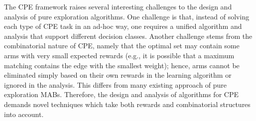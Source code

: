 \documentclass{article}
\newcommand{\junk}[1]{}
\newcommand{\Problem}{{CPE}\xspace}
\begin{document}
The \Problem framework raises several interesting challenges to the design and analysis of pure exploration algorithms. 
One challenge is that, instead of solving each type of \Problem task in an ad-hoc way, one requires a unified algorithm and analysis that support different decision classes.
Another challenge stems from the combinatorial nature of \Problem, namely that the optimal set may contain some arms with very small expected rewards (e.g., it is possible that a maximum matching contains the edge with the smallest weight); 
hence, arms cannot be eliminated simply based on their own rewards in the learning algorithm
	or ignored in the analysis.
%
%
%
This differs from many existing approach of pure exploration MABs.
Therefore, the design and analysis of algorithms for \Problem demands novel techniques which take both rewards and combinatorial structures into account.
\junk{
Before describing our results, we recall two common settings in pure exploration problems: fixed confidence and fixed budget. 
In the fixed confidence setting, the learner need to guarantee that she correctly identifies the optimal set with high probability while uses a small number of rounds(samples).  
In the fixed budget setting, the learner uses at most a fixed number of samples and she need to minimize her probability of error (identifies a suboptimal set).
}
\end{document}
